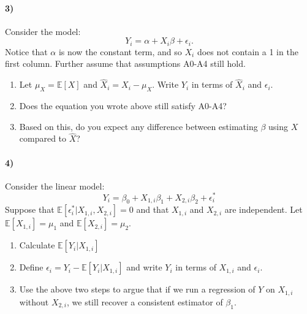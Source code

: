 \documentclass[12pt]{article}
\newcommand\EE{\mathbb{E}}
\newcommand\h{\hat}
\newcommand\eps{\epsilon}
\numberwithin{equation}{section}
\numberwithin{figure}{section}
\numberwithin{table}{section}
\begin{document}
\paragraph{3)} Consider the model:
\[ Y_i = \alpha + X_i\beta + \eps_i.\]
Notice that $\alpha$ is now the constant term, and so $X_i$ does not contain a 1 in the first column. Further assume that assumptions A0-A4 still hold.
\begin{enumerate}
\item Let $\mu_X = \EE[X]$ and $\hat{X}_i = X_i-\mu_X$. Write $Y_i$ in terms of $\h{X}_i$ and $\eps_i$.
\item Does the equation you wrote above still satisfy A0-A4?
\item Based on this, do you expect any difference between estimating $\beta$ using $X$ compared to $\h{X}$?
\end{enumerate}

\paragraph{4)} Consider the linear model:
\[ Y_i = \beta_0 + X_{1,i}\beta_1 + X_{2,i}\beta_2 + \eps^*_i \]
Suppose that $\EE[\eps^*_i|X_{1,i},X_{2,i}] = 0$ and that $X_{1,i}$ and $X_{2,i}$ are independent. Let $\EE[X_{1,i}]=\mu_1$ and $\EE[X_{2,i}]=\mu_2$.
\begin{enumerate}
\item Calculate $\EE[Y_i|X_{1,i}]$
\item Define $\eps_i = Y_i-\EE[Y_i|X_{1,i}]$ and write $Y_i$ in terms of $X_{1,i}$ and $\eps_{i}$.
\item Use the above two steps to argue that if we run a regression of $Y$ on $X_{1,i}$ without $X_{2,i}$, we still recover a consistent estimator of $\beta_1$.
\end{enumerate}
\end{document}
